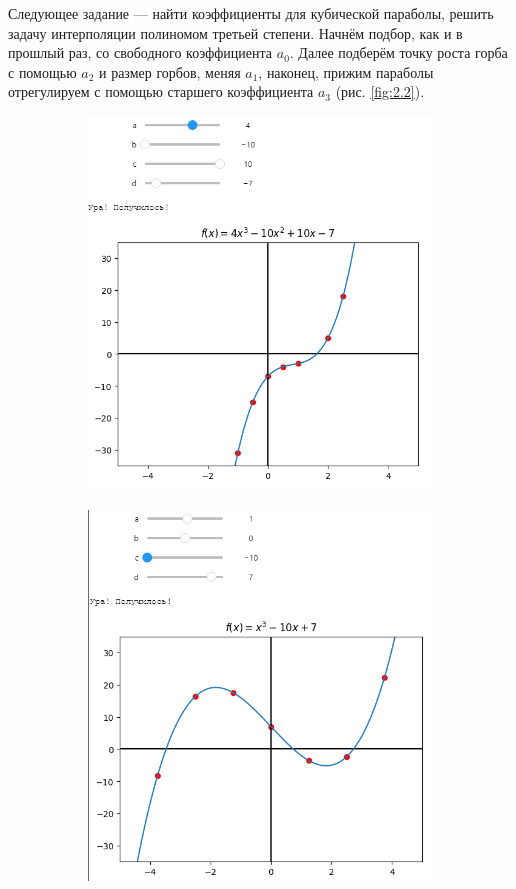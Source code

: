 \documentclass[14pt,a4paper]{extarticle}
\begin{document}
        Следующее задание --- найти коэффициенты для кубической параболы,
решить задачу интерполяции полиномом третьей степени. Начнём подбор, как
и в прошлый раз, со свободного коэффициента $a_0$. Далее подберём точку роста
горба с помощью $a_2$ и размер горбов, меняя $a_1$, наконец, прижим параболы
отрегулируем с помощью старшего коэффициента $a_3$ (рис. \ref{fig:2.2}).

\begin{figure}[h!]
    \begin{subfigure}{.5\textwidth}
        \centering
        \includegraphics[width=0.9\linewidth]{figures/2.2-first.png}
    \end{subfigure}%
    \begin{subfigure}{.5\textwidth}
        \centering
        \includegraphics[width=0.9\linewidth]{figures/2.2-second.png}
    \end{subfigure}


\end{figure}
\end{document}
